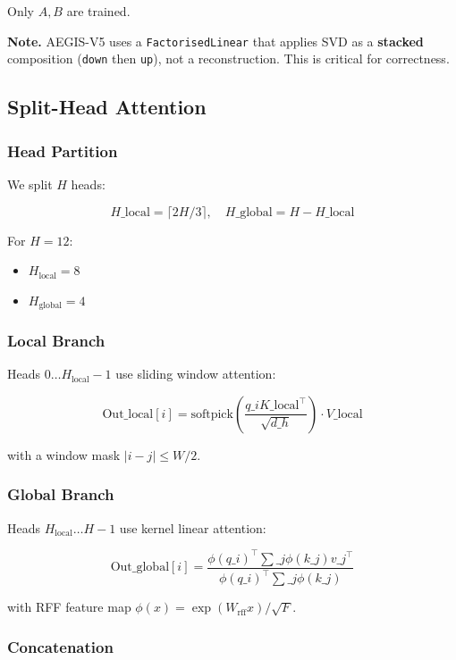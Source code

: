 Only $A, B$ are trained.

\textbf{Note.} AEGIS-V5 uses a \texttt{FactorisedLinear} that applies SVD as a \textbf{stacked} 
composition (\texttt{down} then \texttt{up}), not a reconstruction. This is critical for 
correctness.

\subsection{Split-Head Attention}

\subsubsection{Head Partition}

We split $H$ heads:

\[
H\_\text{local} = \lceil 2H/3 \rceil, \quad
H\_\text{global} = H - H\_\text{local}
\]

For $H = 12$:
\begin{itemize}
\item $H_\text{local} = 8$
\item $H_\text{global} = 4$

\end{itemize}
\subsubsection{Local Branch}

Heads $0 \ldots H_\text{local} - 1$ use sliding window attention:

\[
\text{Out}\_\text{local}[i] = \text{softpick}\!\left(\frac{q\_i K\_\text{local}^\top}{\sqrt{d\_h}}\right) \cdot V\_\text{local}
\]

with a window mask $|i - j| \leq W/2$.

\subsubsection{Global Branch}

Heads $H_\text{local} \ldots H - 1$ use kernel linear attention:

\[
\text{Out}\_\text{global}[i] = \frac{\phi(q\_i)^\top \sum\_j \phi(k\_j) v\_j^\top}{\phi(q\_i)^\top \sum\_j \phi(k\_j)}
\]

with RFF feature map $\phi(x) = \exp(W_\text{rff} x) / \sqrt{F}$.

\subsubsection{Concatenation}

